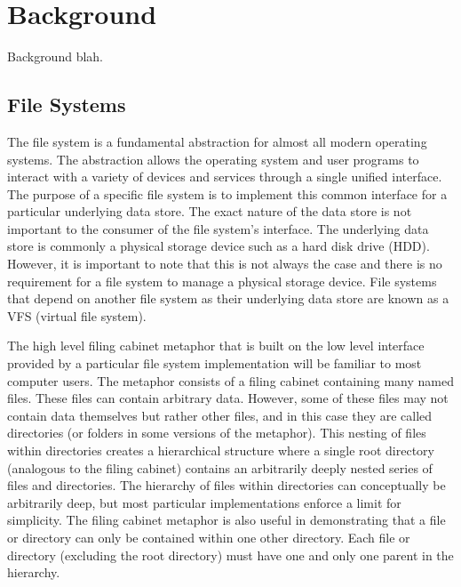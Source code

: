 \chapter{Background}
\vspace{1cm}

Background blah.

\section{File Systems}

The file system is a fundamental abstraction for almost all modern operating
systems. The abstraction allows the operating system and user programs to
interact with a variety of devices and services through a single unified
interface.
The purpose of a specific file system is to implement this common interface for
a particular underlying data store. The exact nature of the data store is not
important to the consumer of the file system's interface. The underlying data
store is commonly a physical storage device such as a hard disk drive (HDD).
However, it is important to note that this is not always the case and there is
no requirement for a file system to manage a physical storage device. File
systems that depend on another file system as their underlying data store are
known as a VFS (virtual file system).

The high level filing cabinet metaphor that is built on the low level interface
provided by a particular file system implementation will be familiar to most
computer users. The metaphor consists of a filing cabinet containing many named
files. These files can contain arbitrary data. However, some of these files may
not contain data themselves but rather other files, and in this case they are
called directories (or folders in some versions of the metaphor). This nesting
of files within directories creates a hierarchical structure where a single
root directory (analogous to the filing cabinet) contains an arbitrarily
deeply nested series of files and directories. The hierarchy of files within
directories can conceptually be arbitrarily deep, but most particular
implementations enforce a limit for simplicity. The filing cabinet metaphor is
also useful in demonstrating that a file or directory can only be contained
within one other directory. Each file or directory (excluding the root
directory) must have one and only one parent in the hierarchy.

